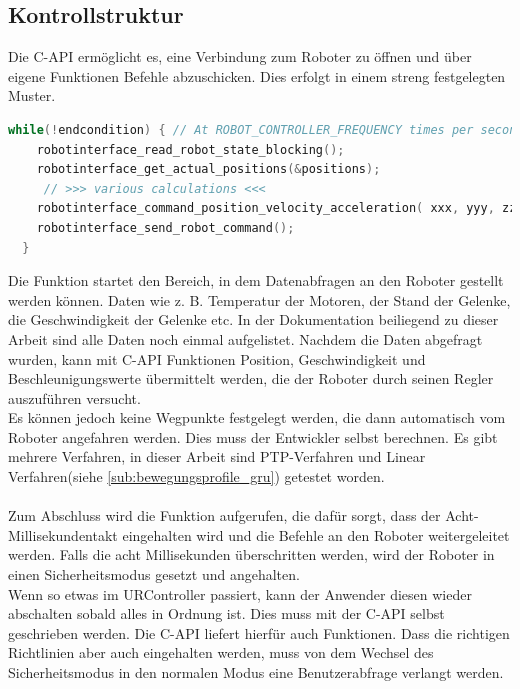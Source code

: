 \subsection{Kontrollstruktur}
\label{capi_control_loop_gru}	

Die C-\acs{API} ermöglicht es, eine Verbindung zum Roboter zu öffnen und über eigene Funktionen Befehle abzuschicken. Dies erfolgt in einem streng festgelegten Muster.

\begin{lstlisting}[language=C,caption={Beispiel der Kontroll-Struktur}, label=lst:robot_control_loop,captionpos=b]
  while(!endcondition) { // At ROBOT_CONTROLLER_FREQUENCY times per second
    robotinterface_read_robot_state_blocking();
    robotinterface_get_actual_positions(&positions);
     // >>> various calculations <<<
    robotinterface_command_position_velocity_acceleration( xxx, yyy, zzz);
    robotinterface_send_robot_command();
  }
\end{lstlisting}

Die Funktion  startet den Bereich, in dem Datenabfragen an den Roboter gestellt werden können. Daten wie z. B. Temperatur der Motoren, der Stand der Gelenke, die Geschwindigkeit der Gelenke etc. In der Dokumentation beiliegend zu dieser Arbeit sind alle Daten noch einmal aufgelistet. Nachdem die Daten abgefragt wurden, kann mit C-\acs{API} Funktionen Position, Geschwindigkeit und Beschleunigungswerte übermittelt werden, die der Roboter durch seinen Regler auszuführen versucht.\\
Es können jedoch keine Wegpunkte festgelegt werden, die dann automatisch vom Roboter angefahren werden. Dies muss der Entwickler selbst 
berechnen. 
Es gibt mehrere Verfahren, in dieser Arbeit sind \ac{PTP}-Verfahren und Linear Verfahren(siehe \ref{sub:bewegungsprofile_gru}) getestet worden.
\\\\
Zum Abschluss wird die Funktion  aufgerufen, die dafür sorgt, dass der Acht-Millisekundentakt eingehalten wird und die Befehle an den Roboter weitergeleitet werden. Falls die acht Millisekunden überschritten werden, wird der Roboter in einen Sicherheitsmodus gesetzt und angehalten.
\\
Wenn so etwas im URController passiert, kann der Anwender diesen wieder abschalten sobald alles in Ordnung ist. Dies muss mit der C-\acs{API} selbst geschrieben werden. Die C-\acs{API} liefert hierfür auch Funktionen. Dass die richtigen Richtlinien aber auch eingehalten werden, muss von dem Wechsel des Sicherheitsmodus in den normalen Modus eine Benutzerabfrage verlangt werden.

